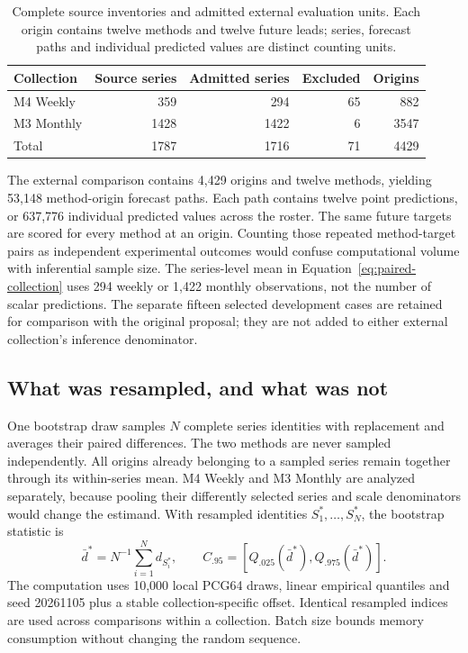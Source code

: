 \begin{table}[htbp]\centering
\caption{Complete source inventories and admitted external evaluation units.
Each origin contains twelve methods and twelve future leads; series, forecast
paths and individual predicted values are distinct counting units.}
\label{tab:collection-inventory}
\begin{tabular}{lrrrr}\toprule
Collection & Source series & Admitted series & Excluded & Origins\\\midrule
M4 Weekly & 359 & 294 & 65 & 882\\
M3 Monthly & 1428 & 1422 & 6 & 3547\\
Total & 1787 & 1716 & 71 & 4429\\\bottomrule
\end{tabular}\end{table}

The external comparison contains 4,429 origins and twelve methods, yielding
53,148 method-origin forecast paths. Each path contains twelve point predictions,
or 637,776 individual predicted values across the roster. The same future targets
are scored for every method at an origin. Counting those repeated method-target
pairs as independent experimental outcomes would confuse computational volume
with inferential sample size. The series-level mean in
Equation~\ref{eq:paired-collection} uses 294 weekly or 1,422 monthly observations,
not the number of scalar predictions. The separate fifteen selected development
cases are retained for comparison with the original proposal; they are not
added to either external collection's inference denominator.

\subsection{What was resampled, and what was not}
\label{sec:paired-resampling}

One bootstrap draw samples $N$ complete series identities with replacement and
averages their paired differences. The two methods are never sampled
independently. All origins already belonging to a sampled series remain
together through its within-series mean. M4 Weekly and M3 Monthly are analyzed
separately, because pooling their differently selected series and scale
denominators would change the estimand. With resampled identities
$S_1^*,\ldots,S_N^*$, the bootstrap statistic is
\begin{equation}
 \bar d^*=N^{-1}\sum_{i=1}^N d_{S_i^*},\qquad
 C_{.95}=[Q_{.025}(\bar d^*),Q_{.975}(\bar d^*)].
 \label{eq:paired-bootstrap}
\end{equation}
The computation uses 10,000 local PCG64 draws, linear empirical quantiles and
seed 20261105 plus a stable collection-specific offset. Identical resampled
indices are used across comparisons within a collection. Batch size bounds
memory consumption without changing the random sequence.

